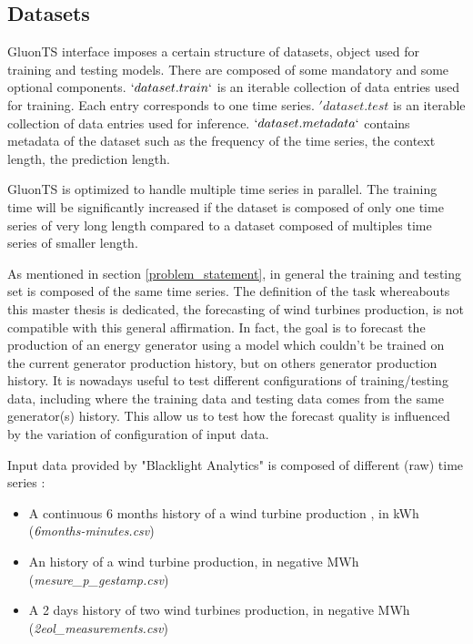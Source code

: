 \subsection{Datasets} \label{datasets}

GluonTS interface imposes a certain structure of datasets, object used for training and testing  models. There are composed of some mandatory and some optional components.
$`dataset.train`$ is an iterable collection of data entries used for training. Each entry corresponds to one time series.  $'dataset.test$ is an iterable collection of data entries used for inference. $`dataset.metadata`$ contains metadata of the dataset such as the frequency of the time series, the context length,  the prediction length.


GluonTS is optimized to handle multiple time series in parallel. The training time will be significantly increased if the dataset is composed of only one time series of very long length compared to a dataset composed of multiples time series of smaller length. 

As mentioned in section \ref{problem_statement}, in general the training and testing set is composed of the same time series.
The definition of the task whereabouts this master thesis is dedicated, the forecasting of wind turbines production, is not compatible with this general affirmation.
In fact, the goal is to forecast the production of an energy generator using a model which couldn't be trained on the current generator production history, but on others generator production history.
It is nowadays useful to test different configurations of training/testing data, including where the training data and testing data comes from the same generator(s) history. This allow us to test how the forecast quality is influenced by the variation of configuration of input data.

Input data provided by "Blacklight Analytics" is composed of different (raw) time series :

\begin{itemize}
    \item A continuous 6 months history of a wind turbine production , in kWh \newline
    (\textit{6months-minutes.csv})
    \item An history of a wind turbine production, in negative MWh \newline 
    (\textit{mesure\_p\_gestamp.csv})
    \item A 2 days history of two wind turbines production, in negative MWh \newline
    (\textit{2eol\_measurements.csv})
\end{itemize}

